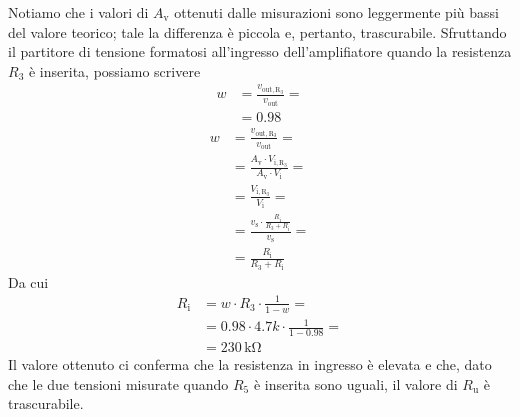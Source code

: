 \documentclass[a4paper]{article}
\begin{document}
			Notiamo che i valori di $ A_{\mathrm{v}} $ ottenuti dalle misurazioni sono leggermente più bassi del valore teorico; tale la differenza è piccola e, pertanto, trascurabile.
			\newline
			Sfruttando il partitore di tensione formatosi all'ingresso dell'amplifiatore quando la resistenza $ R_{3} $ è inserita, possiamo scrivere
			\begin{equation*}
				\begin{split}
					w &= \frac{v_{\mathrm{out,R_{3}}}}{v_{\mathrm{out}}} = \\
					  &= 0.98
				\end{split}
			\end{equation*}
			\begin{equation*}
				\begin{split}
					w &= \frac{v_{\mathrm{out,R_{3}}}}{v_{\mathrm{out}}} = \\
					  &= \frac{A_{\mathrm{v}} \cdot V_{\mathrm{i,R_{3}}}}{A_{\mathrm{v}} \cdot V_{\mathrm{i}}} = \\
					  &= \frac{V_{\mathrm{i,R_{3}}}}{V_{\mathrm{i}}} = \\
					  &= \frac{v_{\mathrm{s}} \cdot \frac{R_{\mathrm{i}}}{R_{3} + R_{\mathrm{i}}}}{v_{\mathrm{s}}} = \\
					  &= \frac{R_{\mathrm{i}}}{R_{3} + R_{\mathrm{i}}}
				\end{split}
			\end{equation*}
			Da cui
			\begin{equation*}
					\begin{split}
						R_{\mathrm{i}} &= w \cdot R_{3} \cdot \frac{1}{1 - w} = \\
									   &= 0.98 \cdot 4.7k \cdot \frac{1}{1 - 0.98} = \\
									   &= 230 \, \mathrm{k\Omega}
					\end{split}
			\end{equation*}
			Il valore ottenuto ci conferma che la resistenza in ingresso è elevata e che, dato che le due tensioni misurate quando $ R_{5} $ è inserita sono uguali, il valore di $ R_{\mathrm{u}} $ è trascurabile.
\end{document}
